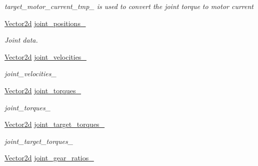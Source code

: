 \begin{DoxyCompactItemize}
\begin{DoxyCompactList}\small\item\em target\+\_\+motor\+\_\+current\+\_\+tmp\+\_\+ is used to convert the joint torque to motor current \end{DoxyCompactList}\item 
\hyperlink{common__header_8hpp_acb6916bc8c9fe9d98c484fd4cc201447}{Vector2d} \hyperlink{classblmc__robots_1_1Stuggihop_a9426a6b5b97a1d57a4db4691f0f4eac5}{joint\+\_\+positions\+\_\+}
\begin{DoxyCompactList}\small\item\em Joint data. \end{DoxyCompactList}\item 
\hyperlink{common__header_8hpp_acb6916bc8c9fe9d98c484fd4cc201447}{Vector2d} \hyperlink{classblmc__robots_1_1Stuggihop_ad9373f04a92810a1833ea012226d48ba}{joint\+\_\+velocities\+\_\+}\hypertarget{classblmc__robots_1_1Stuggihop_ad9373f04a92810a1833ea012226d48ba}{}\label{classblmc__robots_1_1Stuggihop_ad9373f04a92810a1833ea012226d48ba}

\begin{DoxyCompactList}\small\item\em joint\+\_\+velocities\+\_\+ \end{DoxyCompactList}\item 
\hyperlink{common__header_8hpp_acb6916bc8c9fe9d98c484fd4cc201447}{Vector2d} \hyperlink{classblmc__robots_1_1Stuggihop_a414d3559ccc9e7749871860acdad2e82}{joint\+\_\+torques\+\_\+}\hypertarget{classblmc__robots_1_1Stuggihop_a414d3559ccc9e7749871860acdad2e82}{}\label{classblmc__robots_1_1Stuggihop_a414d3559ccc9e7749871860acdad2e82}

\begin{DoxyCompactList}\small\item\em joint\+\_\+torques\+\_\+ \end{DoxyCompactList}\item 
\hyperlink{common__header_8hpp_acb6916bc8c9fe9d98c484fd4cc201447}{Vector2d} \hyperlink{classblmc__robots_1_1Stuggihop_a0cc32133b3a6afd375eaee0537adfdfb}{joint\+\_\+target\+\_\+torques\+\_\+}\hypertarget{classblmc__robots_1_1Stuggihop_a0cc32133b3a6afd375eaee0537adfdfb}{}\label{classblmc__robots_1_1Stuggihop_a0cc32133b3a6afd375eaee0537adfdfb}

\begin{DoxyCompactList}\small\item\em joint\+\_\+target\+\_\+torques\+\_\+ \end{DoxyCompactList}\item 
\hyperlink{common__header_8hpp_acb6916bc8c9fe9d98c484fd4cc201447}{Vector2d} \hyperlink{classblmc__robots_1_1Stuggihop_ab30bb44a129492efbba9412c8f408802}{joint\+\_\+gear\+\_\+ratios\+\_\+}\hypertarget{classblmc__robots_1_1Stuggihop_ab30bb44a129492efbba9412c8f408802}{}\label{classblmc__robots_1_1Stuggihop_ab30bb44a129492efbba9412c8f408802}


\end{DoxyCompactItemize}
